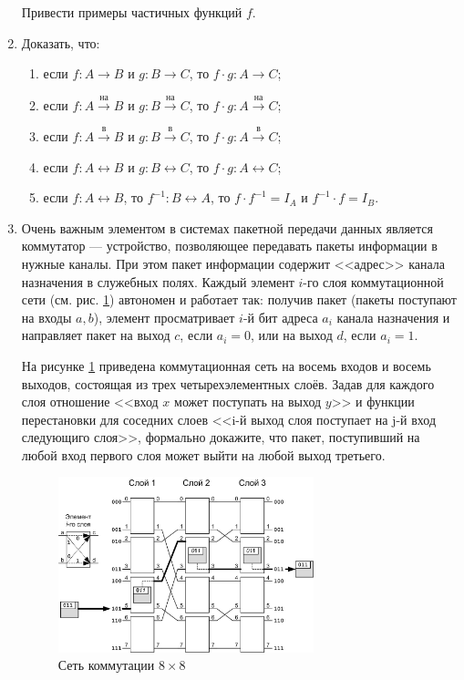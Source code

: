\begin{enumerate}
    Привести примеры частичных функций $f$.
    
    \item Доказать, что:
    \begin{enumerate}
        \item если $f:A\to B$ и $g:B\to C$, то $f\cdot g:A\to C$;
        
        \item если $f:A\xrightarrow{\text{на}} B$ и $g:B\xrightarrow{\text{на}} C$, то $f\cdot g:A\xrightarrow{\text{на}} C$;
        
        \item если $f:A\xrightarrow{\text{в}} B$ и $g:B\xrightarrow{\text{в}} C$, то $f\cdot g:A\xrightarrow{\text{в}} C$;
        
        \item если $f:A\leftrightarrow B$ и $g:B\leftrightarrow C$, то $f\cdot g:A\leftrightarrow C$;
        
        \item если $f:A\leftrightarrow B$, то $f^{-1}:B\leftrightarrow A$, то $f\cdot f^{-1}=I_A$ и $f^{-1}\cdot f=I_B$.
    \end{enumerate}

    \item Очень важным элементом в системах пакетной передачи данных является коммутатор --- устройство, позволяющее передавать пакеты информации в нужные каналы. При этом пакет информации содержит <<адрес>> канала назначения в служебных полях. Каждый элемент $i$-го слоя коммутационной сети (см. рис. \ref{fig:rel:commutate}) автономен и работает так: получив пакет (пакеты поступают на входы $a,b$), элемент просматривает $i$-й бит адреса $a_i$ канала назначения и направляет пакет на выход $c$, если $a_i=0$, или на выход $d$, если $a_i=1$. 
    
    На рисунке \ref{fig:rel:commutate} приведена коммутационная сеть на восемь входов и восемь выходов, состоящая из трех четырехэлементных слоёв. Задав для каждого слоя отношение <<вход $x$ может поступать на выход $y$>> и функции перестановки для соседних слоев <<i-й выход слоя поступает на j-й вход следующиго слоя>>, формально докажите, что пакет, поступивший на любой вход первого слоя может выйти на любой выход третьего.

    \begin{figure}
        \centering
        \includegraphics[width=0.7\textwidth]{fig/commutate}
        \caption{Сеть коммутации $8\times 8$}
        \label{fig:rel:commutate}
    \end{figure} 
    
\end{enumerate}
